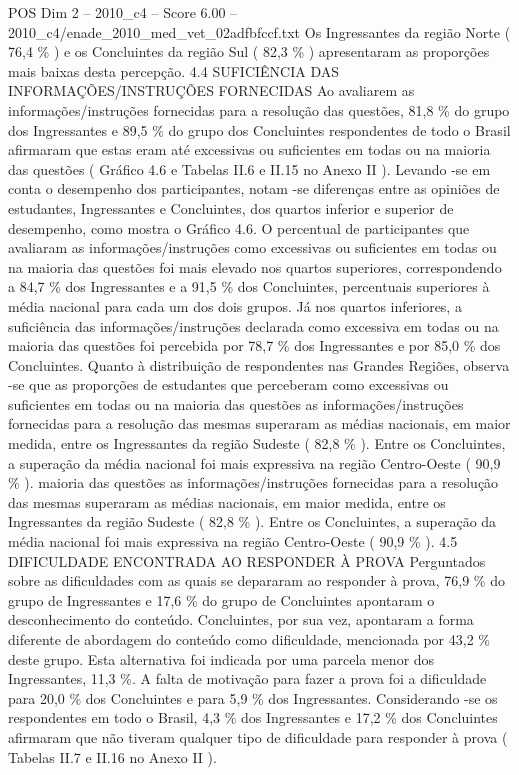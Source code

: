\begin{textsample}{POS Dim 2 – 2010\_c4 – Score 6.00 – 2010\_c4/enade\_2010\_med\_vet\_02adfbfccf.txt}
Os Ingressantes da região Norte ( 76,4 \% ) e os Concluintes da região Sul ( 82,3 \% ) apresentaram as proporções mais baixas desta percepção. 4.4 SUFICIÊNCIA DAS INFORMAÇÕES/INSTRUÇÕES FORNECIDAS Ao avaliarem as informações/instruções fornecidas para a resolução das questões, 81,8 \% do grupo dos Ingressantes e 89,5 \% do grupo dos Concluintes respondentes de todo o Brasil afirmaram que estas eram até excessivas ou suficientes em todas ou na maioria das questões ( Gráfico 4.6 e Tabelas II.6 e II.15 no Anexo II ).
Levando -se em conta o desempenho dos participantes, notam -se diferenças entre as opiniões de estudantes, Ingressantes e Concluintes, dos quartos inferior e superior de desempenho, como mostra o Gráfico 4.6.
O percentual de participantes que avaliaram as informações/instruções como excessivas ou suficientes em todas ou na maioria das questões foi mais elevado nos quartos superiores, correspondendo a 84,7 \% dos Ingressantes e a 91,5 \% dos Concluintes, percentuais superiores à média nacional para cada um dos dois grupos.
Já nos quartos inferiores, a suficiência das informações/instruções declarada como excessiva em todas ou na maioria das questões foi percebida por 78,7 \% dos Ingressantes e por 85,0 \% dos Concluintes.
Quanto à distribuição de respondentes nas Grandes Regiões, observa -se que as proporções de estudantes que perceberam como excessivas ou suficientes em todas ou na maioria das questões as informações/instruções fornecidas para a resolução das mesmas superaram as médias nacionais, em maior medida, entre os Ingressantes da região Sudeste ( 82,8 \% ).
Entre os Concluintes, a superação da média nacional foi mais expressiva na região Centro-Oeste ( 90,9 \% ). maioria das questões as informações/instruções fornecidas para a resolução das mesmas superaram as médias nacionais, em maior medida, entre os Ingressantes da região Sudeste ( 82,8 \% ).
Entre os Concluintes, a superação da média nacional foi mais expressiva na região Centro-Oeste ( 90,9 \% ). 4.5 DIFICULDADE ENCONTRADA AO RESPONDER À PROVA Perguntados sobre as dificuldades com as quais se depararam ao responder à prova, 76,9 \% do grupo de Ingressantes e 17,6 \% do grupo de Concluintes apontaram o desconhecimento do conteúdo.
Concluintes, por sua vez, apontaram a forma diferente de abordagem do conteúdo como dificuldade, mencionada por 43,2 \% deste grupo.
Esta alternativa foi indicada por uma parcela menor dos Ingressantes, 11,3 \%.
A falta de motivação para fazer a prova foi a dificuldade para 20,0 \% dos Concluintes e para 5,9 \% dos Ingressantes.
Considerando -se os respondentes em todo o Brasil, 4,3 \% dos Ingressantes e 17,2 \% dos Concluintes afirmaram que não tiveram qualquer tipo de dificuldade para responder à prova ( Tabelas II.7 e II.16 no Anexo II ).

\end{textsample}
